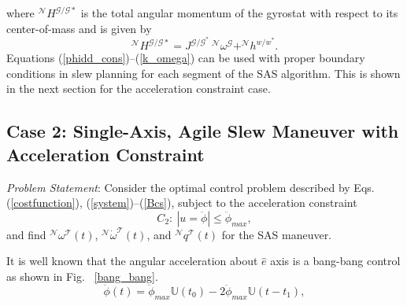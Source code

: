 \documentclass[journal ]{new-aiaa}
\begin{document}
where $^\mathcal{N}H^{\mathcal{G/G*}}$ is the total angular momentum of the gyrostat with respect to its center-of-mass and is given by
\begin{equation}
^\mathcal{N}H^{\mathcal{G/G*}}= J^{\mathcal{G/G^*}}\ ^\mathcal{N}\omega^\mathcal{G}+^\mathcal{N}h^{w/w^*}.
\end{equation}
Equations (\ref{phidd_cons})--(\ref{k_omega}) can be used with proper boundary conditions in slew planning for each segment of the SAS algorithm. This is shown in the next section for the acceleration constraint case.
	
	\subsection{Case 2: Single-Axis, Agile Slew Maneuver with Acceleration Constraint} 
	
	{\it Problem Statement}: Consider the optimal control problem described by Eqs. (\ref{costfunction}), (\ref{system})--(\ref{Bcs}), subject to the acceleration constraint
	\begin{equation}
	C_2: \ |u=\ddot{\phi}|\leq \ddot{\phi}_{max},
	\end{equation}
	and find $^\mathcal{N}\omega^\mathcal{T}(t)$, $^\mathcal{N}\dot{\omega}^\mathcal{T}(t)$, and $^\mathcal{N}q^\mathcal{T}(t)$ for the SAS maneuver.
	
	
	 It is well known that the angular acceleration about $\hat{e}$ axis is a bang-bang control as shown in Fig. ~\ref{bang_bang}.
	\begin{equation}\label{alpha}
	\ddot{\phi}(t)=\ddot{\phi}_{max}\mathbb{U}(t_0)- 2\ddot{\phi}_{max}\mathbb{U}(t-t_1),
	\end{equation}
	
\end{document}
